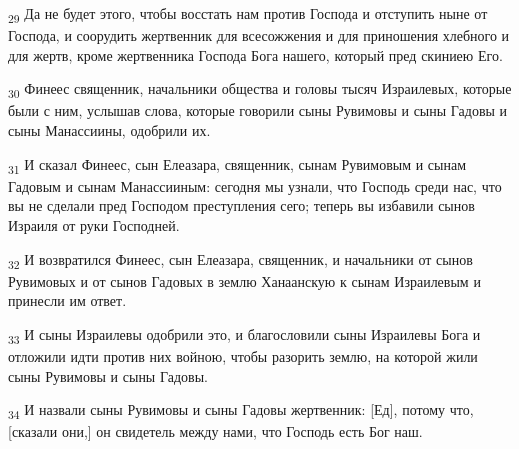 \begin{tcolorbox}
\textsubscript{29} Да не будет этого, чтобы восстать нам против Господа и отступить ныне от Господа, и соорудить жертвенник для всесожжения и для приношения хлебного и для жертв, кроме жертвенника Господа Бога нашего, который пред скиниею Его.
\end{tcolorbox}
\begin{tcolorbox}
\textsubscript{30} Финеес священник, начальники общества и головы тысяч Израилевых, которые были с ним, услышав слова, которые говорили сыны Рувимовы и сыны Гадовы и сыны Манассиины, одобрили их.
\end{tcolorbox}
\begin{tcolorbox}
\textsubscript{31} И сказал Финеес, сын Елеазара, священник, сынам Рувимовым и сынам Гадовым и сынам Манассииным: сегодня мы узнали, что Господь среди нас, что вы не сделали пред Господом преступления сего; теперь вы избавили сынов Израиля от руки Господней.
\end{tcolorbox}
\begin{tcolorbox}
\textsubscript{32} И возвратился Финеес, сын Елеазара, священник, и начальники от сынов Рувимовых и от сынов Гадовых в землю Ханаанскую к сынам Израилевым и принесли им ответ.
\end{tcolorbox}
\begin{tcolorbox}
\textsubscript{33} И сыны Израилевы одобрили это, и благословили сыны Израилевы Бога и отложили идти против них войною, чтобы разорить землю, на которой жили сыны Рувимовы и сыны Гадовы.
\end{tcolorbox}
\begin{tcolorbox}
\textsubscript{34} И назвали сыны Рувимовы и сыны Гадовы жертвенник: [Ед], потому что, [сказали они,] он свидетель между нами, что Господь есть Бог наш.
\end{tcolorbox}
